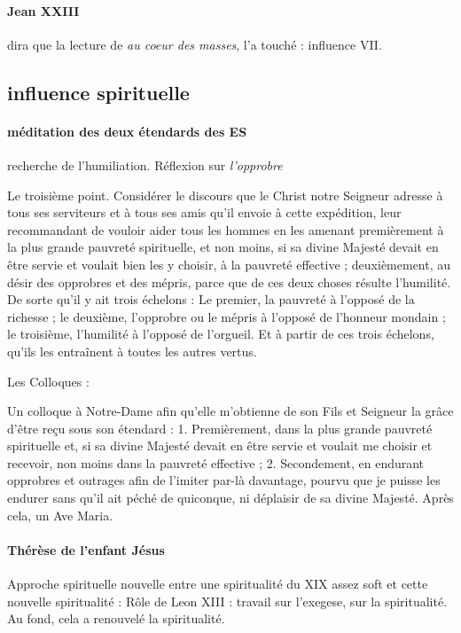 \paragraph{Jean XXIII} dira que la lecture de \textit{au coeur des masses}, l'a touché : influence VII.


\subsection{influence spirituelle}
\paragraph{méditation des deux étendards des ES} recherche de l'humiliation. Réflexion sur \textit{l'opprobre}
\begin{singlequote}
    Le troisième point. Considérer le discours que le Christ notre Seigneur adresse à tous ses serviteurs et à tous ses amis qu'il envoie à cette expédition, leur recommandant de vouloir aider tous les hommes en les amenant premièrement à la plus grande pauvreté spirituelle, et non moins, si sa divine Majesté devait en être servie et voulait bien les y choisir, à la pauvreté effective ; deuxièmement, au désir des opprobres et des mépris, parce que de ces deux choses résulte l'humilité. De sorte qu'il y ait trois échelons : Le premier, la pauvreté à l'opposé de la richesse ; le deuxième, l'opprobre ou le mépris à l'opposé de l'honneur mondain ; le troisième, l'humilité à l'opposé de l'orgueil. Et à partir de ces trois échelons, qu'ils les entraînent à toutes les autres vertus.

Les Colloques :

Un colloque à Notre-Dame afin qu'elle m'obtienne de son Fils et Seigneur la grâce d'être reçu sous son étendard :
1. Premièrement, dans la plus grande pauvreté spirituelle et, si sa divine Majesté devait en être servie et voulait me choisir et recevoir, non moins dans la pauvreté effective ;
2. Secondement, en endurant opprobres et outrages afin de l'imiter par-là davantage, pourvu que je puisse les endurer sans qu'il ait péché de quiconque, ni déplaisir de sa divine Majesté.
Après cela, un Ave Maria.
\end{singlequote}
\paragraph{Thérèse de l'enfant Jésus} Approche spirituelle nouvelle entre une spiritualité du XIX assez soft et cette nouvelle spiritualité : Rôle de Leon XIII : travail sur l'exegese, sur la spiritualité. Au fond, cela a renouvelé la spiritualité.

